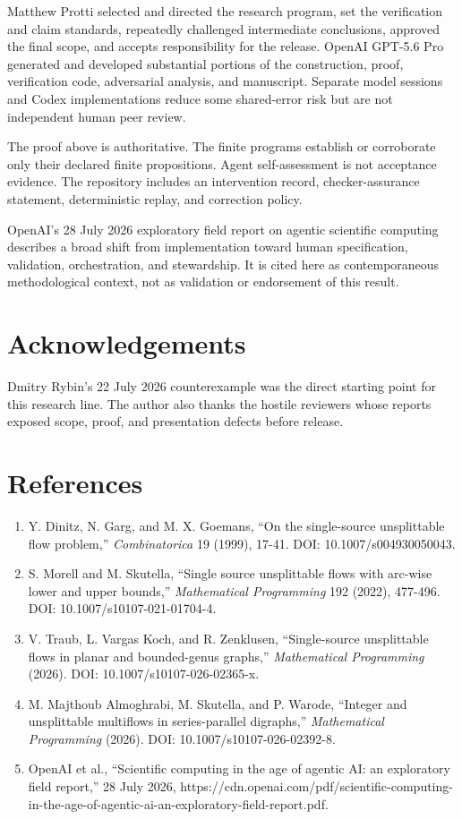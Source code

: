 \documentclass[
  11pt,
]{article}
\providecommand{\tightlist}{%
  \setlength{\itemsep}{0pt}\setlength{\parskip}{0pt}}
\begin{document}
Matthew Protti selected and directed the research program, set the
verification and claim standards, repeatedly challenged intermediate
conclusions, approved the final scope, and accepts responsibility for
the release. OpenAI GPT-5.6 Pro generated and developed substantial
portions of the construction, proof, verification code, adversarial
analysis, and manuscript. Separate model sessions and Codex
implementations reduce some shared-error risk but are not independent
human peer review.

The proof above is authoritative. The finite programs establish or
corroborate only their declared finite propositions. Agent
self-assessment is not acceptance evidence. The repository includes an
intervention record, checker-assurance statement, deterministic replay,
and correction policy.

OpenAI's 28 July 2026 exploratory field report on agentic scientific
computing describes a broad shift from implementation toward human
specification, validation, orchestration, and stewardship. It is cited
here as contemporaneous methodological context, not as validation or
endorsement of this result.

\section{Acknowledgements}\label{acknowledgements}

Dmitry Rybin's 22 July 2026 counterexample was the direct starting point
for this research line. The author also thanks the hostile reviewers
whose reports exposed scope, proof, and presentation defects before
release.

\section{References}\label{references}

\begin{enumerate}
\def\labelenumi{\arabic{enumi}.}
\tightlist
\item
  Y. Dinitz, N. Garg, and M. X. Goemans, ``On the single-source
  unsplittable flow problem,'' \emph{Combinatorica} 19 (1999), 17-41.
  DOI: 10.1007/s004930050043.
\item
  S. Morell and M. Skutella, ``Single source unsplittable flows with
  arc-wise lower and upper bounds,'' \emph{Mathematical Programming} 192
  (2022), 477-496. DOI: 10.1007/s10107-021-01704-4.
\item
  V. Traub, L. Vargas Koch, and R. Zenklusen, ``Single-source
  unsplittable flows in planar and bounded-genus graphs,''
  \emph{Mathematical Programming} (2026). DOI:
  10.1007/s10107-026-02365-x.
\item
  M. Majthoub Almoghrabi, M. Skutella, and P. Warode, ``Integer and
  unsplittable multiflows in series-parallel digraphs,''
  \emph{Mathematical Programming} (2026). DOI:
  10.1007/s10107-026-02392-8.
\item
  OpenAI et al., ``Scientific computing in the age of agentic AI: an
  exploratory field report,'' 28 July 2026,
  https://cdn.openai.com/pdf/scientific-computing-in-the-age-of-agentic-ai-an-exploratory-field-report.pdf.
\end{enumerate}
\end{document}
